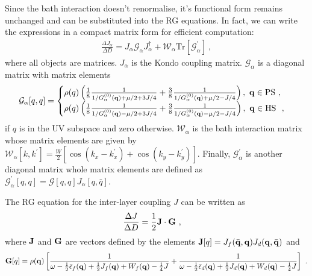 \documentclass[%
reprint,
superscriptaddress,
groupedaddress,
superscriptaddress,
onecolumn,
10pt
]{revtex4-2}
\begin{document}
Since the bath interaction doesn't renormalise, it's functional form remains unchanged and can be substituted into the RG equations. In fact, we can write the expressions in a compact matrix form for efficient computation:
\begin{equation}\begin{aligned}
	\frac{\Delta J_\alpha}{\Delta D} = J_\alpha \mathcal{G}_\alpha J_\alpha^\dagger + \mathcal{W}_\alpha\text{Tr}\left[\mathcal{G}^\prime_\alpha\right]~,
\end{aligned}\end{equation}
where all objects are matrices. \(J_\alpha\) is the Kondo coupling matrix. \(\mathcal{G}_\alpha\) is a diagonal matrix with matrix elements 
\begin{equation}\begin{aligned}
\mathcal{G}_\alpha[q, q] = \begin{cases}
	\rho(q) \left(\frac{1}{8}\frac{1}{1/G_\alpha^{(0)}({\bf q}) + \mu/2 + 3J/4} + \frac{3}{8}\frac{1}{1/G_\alpha^{(0)}({\bf q}) + \mu/2 - J/4}\right),~{\bf q}\in\text{PS}~,\\
\rho(q) \left(\frac{1}{8}\frac{1}{1/G_\alpha^{(0)}({\bf q}) - \mu/2 + 3J/4} + \frac{3}{8}\frac{1}{1/G_\alpha^{(0)}({\bf q}) - \mu/2 - J/4}\right),~{\bf q}\in\text{HS}~~,
\end{cases}
\end{aligned}\end{equation}
if \(q\) is in the UV subspace and zero otherwise. \(\mathcal{W}_\alpha\) is the bath interaction matrix whose matrix elements are given by \(\mathcal{W}_\alpha[k, k^\prime] = \frac{W}{2}\left[\cos(k_x - k^\prime_x) + \cos(k_y - k^\prime_y)\right]\). Finally, \(\mathcal{G}^\prime_\alpha\) is another diagonal matrix whole matrix elements are defined as \(\mathcal{G}^\prime_\alpha[q,q] = \mathcal{G}[q, q] J_\alpha[q,\bar q]\).

The RG equation for the inter-layer coupling \(J\) can be written as
\begin{equation}\begin{aligned}
	\frac{\Delta J}{\Delta D} &= \frac{1}{2} {\bf J} \cdot \mathcal{\bf G}~,
\end{aligned}\end{equation}
where \({\bf J}\) and \(\mathcal{\bf G}\) are vectors defined by the elements \({\bf J}[q] = J_f(\bar{\bf q},{\bf q}) J_d({\bf q},\bar{\bf q})\) and 
\begin{equation}\begin{aligned}
	\mathcal{\bf G}[q] = \rho({\bf q}) \left[\frac{1}{\omega - \frac{1}{2}\bar\epsilon_f({\bf q}) + \frac{1}{2}J_f({\bf q}) + W_f({\bf q}) - \frac{1}{4}J} + \frac{1}{\omega - \frac{1}{2}\bar\epsilon_d({\bf q}) + \frac{1}{2}J_d({\bf q}) + W_d({\bf q}) - \frac{1}{4}J}\right]~.
\end{aligned}\end{equation}
\end{document}

